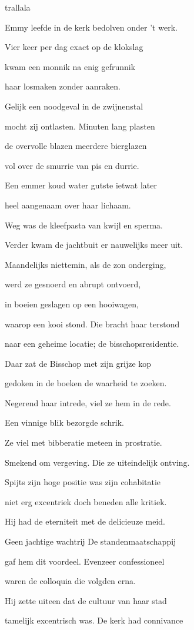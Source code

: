 trallala

Emmy leefde in de kerk
bedolven onder 't werk.

Vier keer per dag
exact op de klokslag

kwam een monnik
na enig gefrunnik

haar losmaken
zonder aanraken.

Gelijk een noodgeval
in de zwijnenstal

mocht zij ontlasten.
Minuten lang plasten

de overvolle blazen
meerdere bierglazen

vol over de smurrie
van pis en durrie.

Een emmer koud water
gutste ietwat later

heel aangenaam
over haar lichaam.

Weg was de kleefpasta
van kwijl en sperma.

Verder kwam de jachtbuit
er nauwelijks meer uit.

Maandelijks niettemin,
als de zon onderging,

werd ze gesnoerd
en abrupt ontvoerd,

in boeien geslagen
op een hooiwagen,

waarop een kooi stond.
Die bracht haar terstond

naar een geheime locatie;
de bisschopsresidentie.

Daar zat de Bisschop
met zijn grijze kop

gedoken in de boeken
de waarheid te zoeken.

Negerend haar intrede,
viel ze hem in de rede.

Een vinnige blik
bezorgde schrik.

Ze viel met bibberatie
meteen in prostratie.

Smekend om vergeving.
Die ze uiteindelijk ontving.

Spijts zijn hoge positie
was zijn cohabitatie

niet erg excentriek
doch beneden alle kritiek.

Hij had de eterniteit
met de delicieuze meid.

Geen jachtige wachtrij
De standenmaatschappij

gaf hem dit voordeel.
Evenzeer confessioneel

waren de colloquia
die volgden erna.

Hij zette uiteen dat
de cultuur van haar stad

tamelijk excentrisch was.
De kerk had connivance

